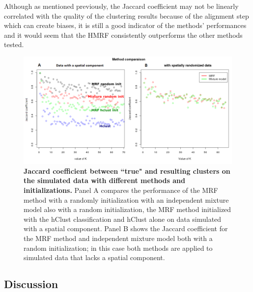 	Although as mentioned previously, the Jaccard coefficient may not be linearly correlated with the quality of the clustering results because of the alignment step which can create biases, it is still a good indicator of the methods' performances and it would seem that the HMRF consistently outperforms the other methods tested.
	\begin{figure}[h]
\centerline{\includegraphics[width=\linewidth]{gfx/chapter5/method_comparison.png}}
\caption{{\bf Jaccard coefficient between ``true" and resulting clusters on the simulated data with different methods and initializations.} Panel A compares the performance of the MRF method with a randomly initialization with an independent mixture model also with a random initialization, the MRF method initialized with the hClust classification and hClust alone on data simulated with a spatial component. Panel B shows the Jaccard coefficient for the MRF method and independent mixture model both with a random initialization; in this case both methods are applied to simulated data that lacks a spatial component.}
\label{fig:methodComparison}
	\end{figure}
	\subsection{Discussion}





